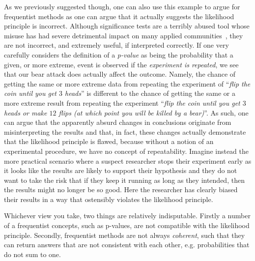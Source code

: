 As we previously suggested though, one can also use this example to argue for frequentist methods as one can argue that it actually
suggests the likelihood principle is incorrect.  Although significance tests are a terribly abused tool whose misuse has had
severe detrimental impact on many applied communities~\citep{goodman1999toward,ioannidis2005most}, they are not incorrect,
and extremely useful, if 
interpreted correctly.  If one very carefully considers
the definition of a \emph{p-value} as being the probability that a given, or more extreme, event is observed if the
\emph{experiment is repeated}, we see that our bear attack does actually affect the outcome.  Namely, the chance of getting the same
or more extreme data from repeating the experiment of ``\textit{flip the coin until you get $3$ heads}'' is different to 
the chance of getting the same or a more extreme result from repeating the experiment 
``\textit{flip the coin until you get $3$ heads or make $12$ flips (at which point you will be killed by a bear)}''.  
As such, one can argue that the apparently absurd
changes in conclusions originate from misinterpreting the results and that, in fact, these changes actually demonstrate
that the likelihood principle is flawed, because without a notion of an experimental procedure, 
we have no concept of repeatability.  Imagine instead the more practical scenario where a suspect researcher stops their experiment
early as it looks like the results are likely to support their hypothesis and they do not want to take the risk that if they
keep it running as long as they intended, then the results might no longer be so good.  Here the researcher has clearly
biased their results in a way that ostensibly violates the likelihood principle.

Whichever view you take, two things are relatively indisputable.  Firstly a number of a frequentist concepts, such as p-values,
are not compatible with the likelihood principle.  Secondly, frequentist methods are not always \emph{coherent}, such that they can
return answers that are not consistent with each other, e.g. probabilities that do not sum to one.  

